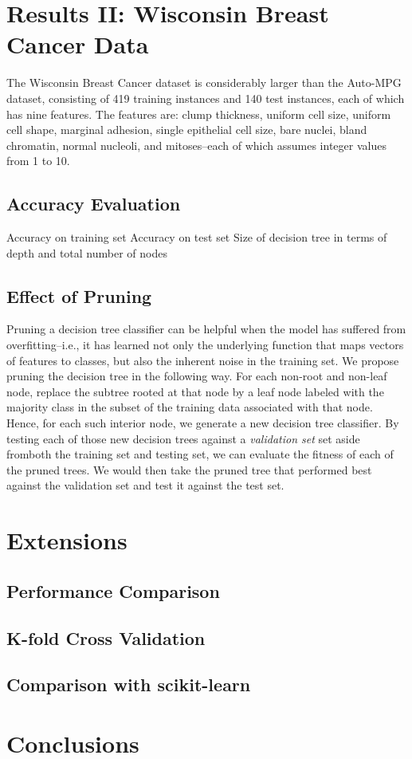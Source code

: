 \documentclass[12pt, conference, compsocconf]{IEEEtran}
\begin{document}
\section{Results II: Wisconsin Breast Cancer Data}
The Wisconsin Breast Cancer dataset is considerably larger than the Auto-MPG dataset, consisting of 419 training instances and 140 test instances, each of which has nine features. 
The features are: clump thickness, uniform cell size, uniform cell shape, marginal adhesion, single epithelial cell size, bare nuclei, bland chromatin, normal nucleoli, and mitoses--each of which assumes integer values from 1 to 10. 

\subsection{Accuracy Evaluation}
Accuracy on training set
Accuracy on test set
Size of decision tree in terms of depth and total number of nodes

\subsection{Effect of Pruning}
Pruning a decision tree classifier can be helpful when the model has suffered from overfitting--i.e., it has learned not only the underlying function that maps vectors of features to classes, but also the inherent noise in the training set. 
We propose pruning the decision tree in the following way. 
For each non-root and non-leaf node, replace the subtree rooted at that node by a leaf node labeled with the majority class in the subset of the training data associated with that node. 
Hence, for each such interior node, we generate a new decision tree classifier.
By testing each of those new decision trees against a \emph{validation set} set aside fromboth the training set and testing set, we can evaluate the fitness of each of the pruned trees. 
We would then take the pruned tree that performed best against the validation set and test it against the test set. 

\section{Extensions}

\subsection{Performance Comparison}

\subsection{K-fold Cross Validation}

\subsection{Comparison with scikit-learn}

\section{Conclusions}

%
%
\end{document}
